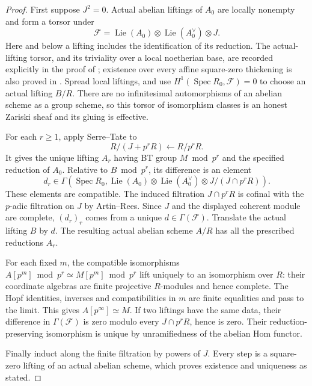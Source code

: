 \begin{proof}
First suppose $J^2=0$. Actual abelian liftings of $A_0$ are locally
nonempty and form a torsor under
\[
 \mathcal F=\operatorname{Lie}(A_0)\otimes
             \operatorname{Lie}(A_0^\vee)\otimes J.
\]
Here and below a lifting includes the identification of its reduction.
The actual-lifting torsor, and its triviality over a local noetherian
base, are recorded explicitly in the proof of
\cite[Lemma~24, p.590]{VasiuZink2010Purity}; existence over every affine square-zero thickening is also
proved in \cite[Chapter~IV, Lemma~2.8.1, pp.148--149]{Messing1972}. Spread local liftings,
and use $H^1(\operatorname{Spec}R_0,\mathcal F)=0$ to choose an actual
lifting $B/R$. There are no infinitesimal automorphisms of an abelian
scheme as a group scheme, so this torsor of isomorphism classes is
an honest Zariski sheaf and its gluing is effective.

For each $r\geq1$, apply Serre--Tate to
\[
 R/(J+p^rR)\longleftarrow R/p^rR.
\]
It gives the unique lifting $A_r$ having BT group $M\bmod p^r$ and
the specified reduction of $A_0$. Relative to $B\bmod p^r$, its
difference is an element
\[
 d_r\in\Gamma\!\left(\operatorname{Spec}R_0,
   \operatorname{Lie}(A_0)\otimes\operatorname{Lie}(A_0^\vee)
        \otimes J/(J\cap p^rR)\right).
\]
These elements are compatible. The induced filtration
$J\cap p^rR$ is cofinal with the $p$-adic filtration on $J$ by
Artin--Rees. Since $J$ and the displayed coherent module are complete,
$(d_r)_r$ comes from a unique $d\in\Gamma(\mathcal F)$.
Translate the actual lifting $B$ by $d$. The resulting actual abelian
scheme $A/R$ has all the prescribed reductions $A_r$.

For each fixed $m$, the compatible isomorphisms
$A[p^m]\bmod p^r\simeq M[p^m]\bmod p^r$ lift uniquely to an
isomorphism over $R$: their coordinate algebras are finite projective
$R$-modules and hence complete. The Hopf identities, inverses and
compatibilities in $m$ are finite equalities and pass to the limit.
This gives $A[p^\infty]\simeq M$. If two liftings have the same data,
their difference in $\Gamma(\mathcal F)$ is zero modulo every
$J\cap p^rR$, hence is zero. Their reduction-preserving isomorphism
is unique by unramifiedness of the abelian Hom functor.

Finally induct along the finite filtration by powers of $J$.
Every step is a square-zero lifting of an actual abelian scheme,
which proves existence and uniqueness as stated.
\end{proof}

